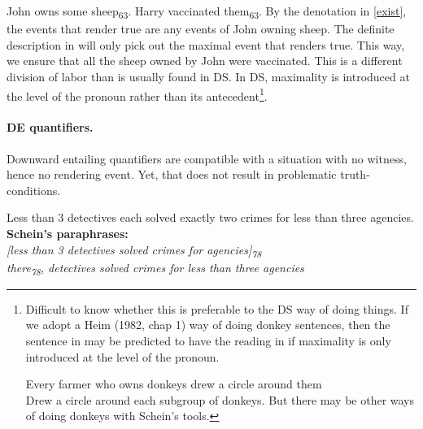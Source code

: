 \documentclass[english]{article}
\begin{document}
\pex
\a John owns some sheep\textsubscript{63}.
\a Harry vaccinated them\textsubscript{63}.
\xe
%
By the denotation in \cref{exist}, the events that render \clastxa true are any events of John owning sheep.  The definite description in \clastxb will only pick out the maximal event that renders \clastxa true. This way, we ensure that all the sheep owned by John were vaccinated. This is a different division of labor than is usually found in DS. In DS, maximality is introduced at the level of the pronoun rather than its antecedent\footnote{Difficult to know whether this is preferable to the DS way of doing things. If we adopt a Heim (1982, chap 1) way of doing donkey sentences, then the sentence in \cnextxa may be predicted to have the reading in \cnextxb if maximality is only introduced at the level of the pronoun.

\pex
\a 
Every farmer who owns donkeys drew a circle around them\\
\a 
Drew a circle around each subgroup of donkeys.
\xe
%
But there may be other ways of doing donkeys with Schein's tools.
}.

\paragraph{DE quantifiers.} Downward entailing quantifiers are compatible with a situation with no witness, hence no rendering event. Yet, that does not result in problematic truth-conditions.

\pex
\a 
Less than 3 detectives each solved exactly two crimes for less than three agencies.
\a 
\textbf{Schein's paraphrases:}\\
\emph{[less than 3 detectives solved crimes for agencies]\textsubscript{78}}\\
\emph{there\textsubscript{78}, detectives solved crimes for less than three agencies}
\xe
%

\end{document}

